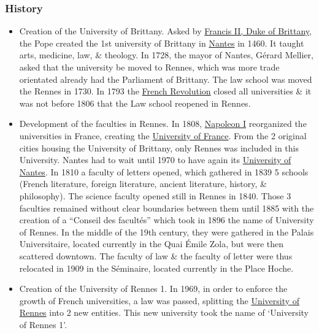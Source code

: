 \documentclass{article}
\begin{document}
\subsubsection{History}

\begin{itemize}
	\item {\sf Creation of the University of Brittany.} Asked by \href{https://en.wikipedia.org/wiki/Francis_II,_Duke_of_Brittany}{Francis II, Duke of Brittany}, the Pope created the 1st university of Brittany in \href{https://en.wikipedia.org/wiki/Nantes}{Nantes} in 1460. It taught arts, medicine, law, \& theology. In 1728, the mayor of Nantes, G\'erard Mellier, asked that the university be moved to Rennes, which was more trade orientated already had the Parliament of Brittany. The law school was moved the Rennes in 1730. In 1793 the \href{https://en.wikipedia.org/wiki/French_Revolution}{French Revolution} closed all universities \& it was not before 1806 that the Law school reopened in Rennes.
	\item {\sf Development of the faculties in Rennes.} In 1808, \href{https://en.wikipedia.org/wiki/Napoleon_I_of_France}{Napoleon I} reorganized the universities in France, creating the \href{https://en.wikipedia.org/wiki/University_of_France}{University of France}. From the 2 original cities housing the University of Brittany, only Rennes was included in this University. Nantes had to wait until 1970 to have again its \href{https://en.wikipedia.org/wiki/University_of_Nantes}{University of Nantes}. In 1810 a faculty of letters opened, which gathered in 1839 5 schools (French literature, foreign literature, ancient literature, history, \& philosophy). The science faculty opened still in Rennes in 1840. Those 3 faculties remained without clear boundaries between them until 1885 with the creation of a ``Conseil des facult\'es'' which took in 1896 the name of University of Rennes. In the middle of the 19th century, they were gathered in the Palais Universitaire, located currently in the Quai \'Emile Zola, but were then scattered downtown. The faculty of law \& the faculty of letter were thus relocated in 1909 in the S\'eminaire, located currently in the Place Hoche.
	\item {\sf Creation of the University of Rennes 1.} In 1969, in order to enforce the growth of French universities, a law was passed, splitting the \href{https://en.wikipedia.org/wiki/University_of_Rennes}{University of Rennes} into 2 new entities. This new university took the name of `University of Rennes 1'.

\end{itemize}
\end{document}
